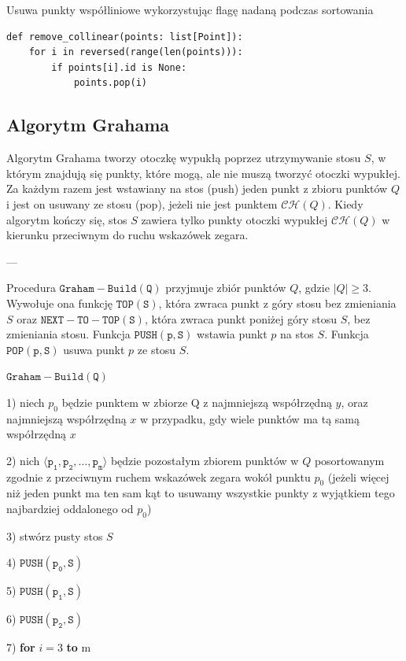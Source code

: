 \documentclass[12pt]{article}
\begin{document}
\mbox{}
\par Usuwa punkty współliniowe wykorzystując flagę nadaną podczas sortowania
\begin{Verbatim}
def remove_collinear(points: list[Point]):
	for i in reversed(range(len(points))):
		if points[i].id is None:
			points.pop(i)
\end{Verbatim}

\newpage

\subsection*{Algorytm Grahama}
Algorytm Grahama tworzy otoczkę wypukłą poprzez utrzymywanie stosu $S$, w którym znajdują się punkty, które mogą, ale nie muszą tworzyć otoczki wypukłej. Za każdym razem jest wstawiany na stos (push) jeden punkt z zbioru punktów $Q$ i jest on usuwany ze stosu (pop), jeżeli nie jest punktem $\mathcal{CH}(Q)$. Kiedy algorytm kończy się, stos $S$ zawiera tylko punkty otoczki wypukłej $\mathcal{CH}(Q)$ w kierunku przeciwnym do ruchu wskazówek zegara.

---

Procedura $\mathtt{Graham-Build(Q)}$ przyjmuje zbiór punktów $Q$, gdzie $|Q| \geq 3$. Wywołuje ona funkcję $\mathtt{TOP(S)}$, która zwraca punkt z góry stosu bez zmieniania $S$ oraz
$\mathtt{NEXT-TO-TOP(S)}$, która zwraca punkt poniżej góry stosu $S$, bez zmieniania stosu. Funkcja $\mathtt{PUSH(p, S)}$ wstawia punkt $p$ na stos $S$. Funkcja $\mathtt{POP(p, S)}$ usuwa punkt $p$ ze stosu $S$.


\mbox{}\newline
$\mathtt{Graham-Build(Q)}$  

1)  niech $p_0$ będzie punktem w zbiorze Q z najmniejszą współrzędną $y$,  
oraz najmniejszą współrzędną $x$ w przypadku, gdy wiele punktów ma tą samą współrzędną $x$  


2)  nich $\mathtt{\langle p_1, p_2, \dots, p_m \rangle}$ będzie pozostałym zbiorem punktów w $Q$ posortowanym  
zgodnie z przeciwnym ruchem wskazówek zegara wokół punktu $p_0$  
(jeżeli więcej niż jeden punkt ma ten sam kąt to usuwamy wszystkie punkty  
z wyjątkiem tego najbardziej oddalonego od $p_0$)  


3) stwórz pusty stos $S$  


4) $\mathtt{PUSH(p_0, S)}$


5) $\mathtt{PUSH(p_1, S)}$


6) $\mathtt{PUSH(p_2, S)}$


7) \textbf{for} $i = 3$ \textbf{to} m  
\end{document}
